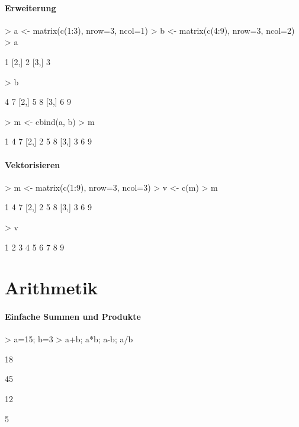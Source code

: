 \paragraph{Erweiterung}
\begin{Schunk}
\begin{Sinput}
> a <- matrix(c(1:3), nrow=3, ncol=1)
> b <- matrix(c(4:9), nrow=3, ncol=2)
> a
\end{Sinput}
\begin{Soutput}
     [,1]
[1,]    1
[2,]    2
[3,]    3
\end{Soutput}
\begin{Sinput}
> b
\end{Sinput}
\begin{Soutput}
     [,1] [,2]
[1,]    4    7
[2,]    5    8
[3,]    6    9
\end{Soutput}
\begin{Sinput}
> m <- cbind(a, b)
> m
\end{Sinput}
\begin{Soutput}
     [,1] [,2] [,3]
[1,]    1    4    7
[2,]    2    5    8
[3,]    3    6    9
\end{Soutput}
\end{Schunk}

\paragraph{Vektorisieren}
\begin{Schunk}
\begin{Sinput}
> m <- matrix(c(1:9), nrow=3, ncol=3)
> v <- c(m)
> m
\end{Sinput}
\begin{Soutput}
     [,1] [,2] [,3]
[1,]    1    4    7
[2,]    2    5    8
[3,]    3    6    9
\end{Soutput}
\begin{Sinput}
> v
\end{Sinput}
\begin{Soutput}
[1] 1 2 3 4 5 6 7 8 9
\end{Soutput}
\end{Schunk}

\section{Arithmetik}
\paragraph{Einfache Summen und Produkte}
\begin{Schunk}
\begin{Sinput}
> a=15; b=3
> a+b; a*b; a-b; a/b
\end{Sinput}
\begin{Soutput}
[1] 18
\end{Soutput}
\begin{Soutput}
[1] 45
\end{Soutput}
\begin{Soutput}
[1] 12
\end{Soutput}
\begin{Soutput}
[1] 5
\end{Soutput}
\end{Schunk}

